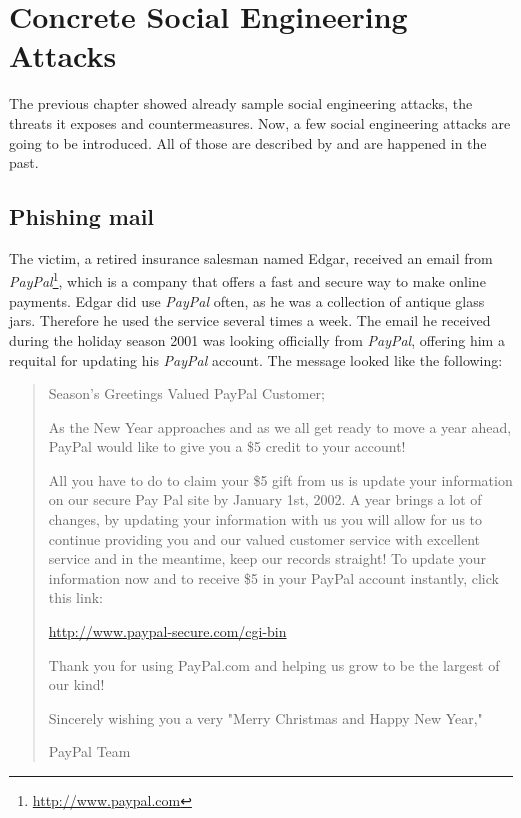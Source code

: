\chapter{Concrete Social Engineering Attacks}
\label{chapter:attacks}

The previous chapter showed already sample social engineering attacks, the
threats it exposes and countermeasures. Now, a few social engineering attacks
are going to be introduced. All of those are described by \cite{mitnick2003}
and are happened in the past.

\section{Phishing mail}

The victim, a retired insurance salesman named Edgar, received an email from
\textit{PayPal}\footnote{\url{http://www.paypal.com}}, which is a company that
offers a fast and secure way to make online payments. Edgar did use
\textit{PayPal} often, as he was a collection of antique glass jars. Therefore
he used the service several times a week. The email he received during the
holiday season 2001 was looking officially
from \textit{PayPal}, offering him a requital for updating his
\textit{PayPal} account. The message looked like the following:

\begin{quote}
Season's Greetings Valued PayPal Customer;

As the New Year approaches and as we all get ready to move a year ahead,
PayPal would like to give you a \$5 credit to your account!

All you have to do to claim your \$5 gift from us is update your information on
our secure Pay Pal site by January 1st, 2002. A year brings a lot of changes,
by updating your information with us you will allow for us to continue
providing you and our valued customer service with excellent service and in the
meantime, keep our records straight! To update your information now and to
receive \$5 in your PayPal account instantly, click this link:

\url{http://www.paypal-secure.com/cgi-bin}

Thank you for using PayPal.com and helping us grow to be the largest of our
kind!

Sincerely wishing you a very "Merry Christmas and Happy New Year,"

PayPal Team

\end{quote}

